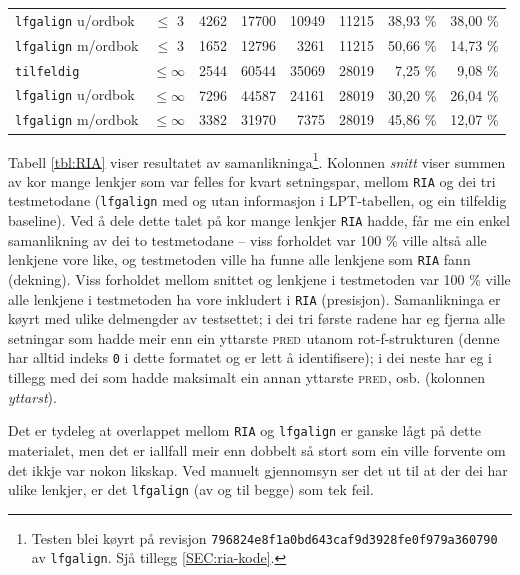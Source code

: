 \documentclass[12pt,a4paper,oneside,draft]{report}
\newcommand{\F}[2]{\textsc{#1}\ensuremath{_{#2}}}
\newcommand{\PRED}{\F{pred}{}}
\begin{document}
\begin{table}[htb]
\begin{center}
\begin{tabular}{lcrrrrrr}
 \texttt{lfgalign} u/ordbok  &  $\leq$ 3       &   4262  &  17700  &    10949  &                 11215  &  38,93 \%           &  38,00 \%              \\
 \texttt{lfgalign} m/ordbok  &  $\leq$ 3       &   1652  &  12796  &     3261  &                 11215  &  50,66 \%           &  14,73 \%              \\
\hline
 \texttt{tilfeldig}          &  $\leq \infty$  &   2544  &  60544  &    35069  &                 28019  &  7,25 \%            &  9,08 \%               \\
 \texttt{lfgalign} u/ordbok  &  $\leq \infty$  &   7296  &  44587  &    24161  &                 28019  &  30,20 \%           &  26,04 \%              \\
 \texttt{lfgalign} m/ordbok  &  $\leq \infty$  &   3382  &  31970  &     7375  &                 28019  &  45,86 \%           &  12,07 \%              \\
\end{tabular}
\end{center}
\end{table}


Tabell \ref{tbl:RIA} viser resultatet av
 samanlikninga\footnote{Testen blei køyrt på revisjon
        \texttt{796824e8f1a0bd643caf9d3928fe0f979a360790} av \texttt{lfgalign}.  Sjå
        tillegg \ref{SEC:ria-kode}. }. Kolonnen \emph{snitt} viser summen av kor mange
 lenkjer som var felles for kvart setningspar, mellom \texttt{RIA} og dei tri
 testmetodane (\texttt{lfgalign} med og utan informasjon i LPT-tabellen, og
 ein tilfeldig baseline). Ved å dele dette talet på kor mange lenkjer
 \texttt{RIA} hadde, får me ein enkel samanlikning av dei to testmetodane --
 viss forholdet var 100 \% ville altså alle lenkjene vore like, og
 testmetoden ville ha funne alle lenkjene som \texttt{RIA} fann
 (dekning). Viss forholdet mellom snittet og lenkjene i testmetoden
 var 100 \% ville alle lenkjene i testmetoden ha vore inkludert i \texttt{RIA}
 (presisjon). Samanlikninga er køyrt med ulike delmengder av
 testsettet; i dei tri første radene har eg fjerna alle setningar som
 hadde meir enn ein yttarste \PRED{} utanom rot-f\hyp{}strukturen (denne
 har alltid indeks \texttt{0} i dette formatet og er lett å identifisere); i
 dei neste har eg i tillegg med dei som hadde maksimalt ein annan
 yttarste \PRED{}, osb. (kolonnen \emph{yttarst}).

Det er tydeleg at overlappet mellom \texttt{RIA} og \texttt{lfgalign} er ganske lågt
 på dette materialet, men det er iallfall meir enn dobbelt så stort
 som ein ville forvente om det ikkje var nokon likskap. Ved manuelt
 gjennomsyn ser det ut til at der dei har ulike lenkjer, er det
 \texttt{lfgalign} (av og til begge) som tek feil.
\end{document}
